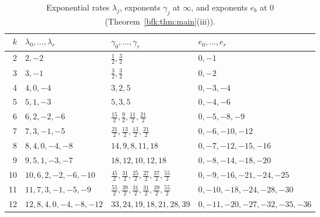 \documentclass[11pt,a4paper]{article}
\theoremstyle{definition}
\theoremstyle{remark}
\numberwithin{equation}{section}
\begin{document}
\begin{table}[ht]
\centering
\caption{Exponential rates $\lambda_j$, exponents $\gamma_j$ at $\infty$, and exponents $e_b$ at $0$ (Theorem~\ref{bfk:thm:main}(iii)).}\label{bfk:tab:exp}
\begin{tabular}{@{}rlll@{}}
\toprule
$k$ & $\lambda_0,\dots,\lambda_r$ & $\gamma_0,\dots,\gamma_r$ & $e_0,\dots,e_r$\\
\midrule
2 & $2,-2$ & $\tfrac12,\tfrac32$ & $0,-1$\\
3 & $3,-1$ & $\tfrac32,\tfrac32$ & $0,-2$\\
4 & $4,0,-4$ & $3,2,5$ & $0,-3,-4$\\
5 & $5,1,-3$ & $5,3,5$ & $0,-4,-6$\\
6 & $6,2,-2,-6$ & $\tfrac{15}2,\tfrac92,\tfrac{11}2,\tfrac{21}2$ & $0,-5,-8,-9$\\
7 & $7,3,-1,-5$ & $\tfrac{21}2,\tfrac{13}2,\tfrac{13}2,\tfrac{21}2$ & $0,-6,-10,-12$\\
8 & $8,4,0,-4,-8$ & $14,9,8,11,18$ & $0,-7,-12,-15,-16$\\
9 & $9,5,1,-3,-7$ & $18,12,10,12,18$ & $0,-8,-14,-18,-20$\\
10 & $10,6,2,-2,-6,-10$ & $\tfrac{45}2,\tfrac{31}2,\tfrac{25}2,\tfrac{27}2,\tfrac{37}2,\tfrac{55}2$ & $0,-9,-16,-21,-24,-25$\\
11 & $11,7,3,-1,-5,-9$ & $\tfrac{55}2,\tfrac{39}2,\tfrac{31}2,\tfrac{31}2,\tfrac{39}2,\tfrac{55}2$ & $0,-10,-18,-24,-28,-30$\\
12 & $12,8,4,0,-4,-8,-12$ & $33,24,19,18,21,28,39$ & $0,-11,-20,-27,-32,-35,-36$\\
\bottomrule
\end{tabular}
\end{table}
\end{document}
